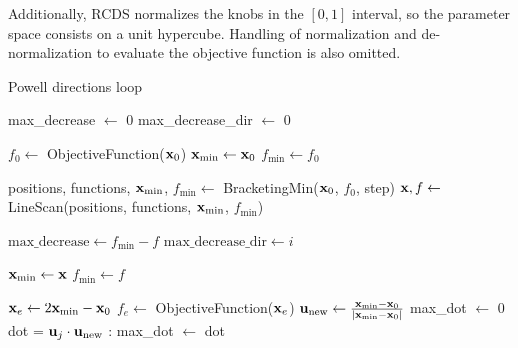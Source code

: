 Additionally, RCDS normalizes the knobs in the $[0, 1]$ interval, so the parameter space consists on a unit hypercube. Handling of normalization and de-normalization to evaluate the objective function is also omitted.

\begin{algorithm}
    \caption{Powell directions loop}\label{alg:powell}
    \begin{algorithmic}[1]
        \State max\_decrease $\gets$ 0
        \State max\_decrease\_dir $\gets$ 0

        \State $f_0\gets$ ObjectiveFunction($\vb{x}_0$)
        \State $\vb{x}_{\text{min}}\gets \vb{x}_0$
        \State $f_{\text{min}}\gets f_0$

            \State positions, functions, $\vb{x}_{\text{min}}$, $f_{\text{min}}\gets  $ BracketingMin($\vb{x}_0$, $f_0$, step)
            \State $\vb{x}, f \gets$ LineScan(positions, functions, $\vb{x}_{\text{min}}$, $f_{\text{min}}$)

                \State $ \text{max\_decrease}\gets f_{\text{min}} - f$
                \State $ \text{max\_decrease\_dir}\gets i$
            \EndIf

            \State $\vb{x}_{\text{min}}\gets \vb{x}$
            \State $f_{\text{min}}\gets f$

            \State $\vb{x}_e\gets 2 \vb{x}_{\text{min}} - \vb{x}_0$
            \State $f_e \gets$ ObjectiveFunction($\vb{x}_e$)
            \State $\vb{u}_{\text{new}} \gets \frac{\vb{x}_{\text{min}}-\vb{x}_0}{|\vb{x}_{\text{min}}-\vb{x}_0|}$
            \State max\_dot $\gets$ 0
            \State dot = $\vb{u}_j\cdot \vb{u}_{\text{new}}$
            :
                \State max\_dot $\gets$ dot
            \EndIf
            \EndFor


\end{algorithmic}
\end{algorithm}
